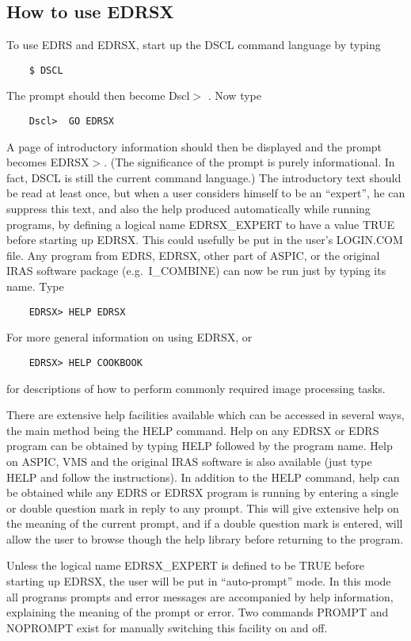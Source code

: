 \subsection {How to use EDRSX}
To use EDRS and EDRSX, start up the DSCL command language by typing
\begin{verbatim}
    $ DSCL
\end{verbatim}
The prompt should then become Dscl$>$ . Now type 
\begin{verbatim}
    Dscl>  GO EDRSX
\end{verbatim}
A page of introductory information should then be displayed and the prompt
becomes EDRSX$>$. 
(The significance of the prompt is purely informational.
In fact, DSCL is still the current command language.)
The introductory text should be read at least once, but when a user considers
himself to be an ``expert'', he can suppress this text, and also the help
produced automatically while running programs, by defining a logical name
EDRSX\_EXPERT to have a value TRUE before starting up EDRSX.
This could usefully be put in the user's LOGIN.COM file.
Any program from EDRS, EDRSX, other part of ASPIC, or the original IRAS software
package (e.g.\ I\_COMBINE) can now be run just by typing its name.
Type
\begin{verbatim}
    EDRSX> HELP EDRSX
\end{verbatim}
For more general information on using EDRSX, or
\begin{verbatim}
    EDRSX> HELP COOKBOOK
\end{verbatim}
for descriptions of how to perform commonly required image processing tasks.

There are extensive help facilities available which can be accessed in several
ways, the main method being the HELP command.
Help on any EDRSX or EDRS program can be obtained by typing HELP followed by the
program name.
Help on ASPIC, VMS and the original IRAS software is also available (just type
HELP and follow the instructions).
In addition to the HELP command, help can be obtained while any EDRS or EDRSX
program is running by entering a single or double question mark in reply to
any prompt.
This will give extensive help on the meaning of the current prompt, and if a
double question mark is entered, will allow the user to browse though the help
library before returning to the program.

Unless the logical name EDRSX\_EXPERT is defined to be TRUE before starting up
EDRSX, the user will be put in ``auto-prompt'' mode.
In this mode all programs prompts and error messages are accompanied by help
information, explaining the meaning of the prompt or error.
Two commands PROMPT and NOPROMPT exist for manually switching this facility
on and off.
